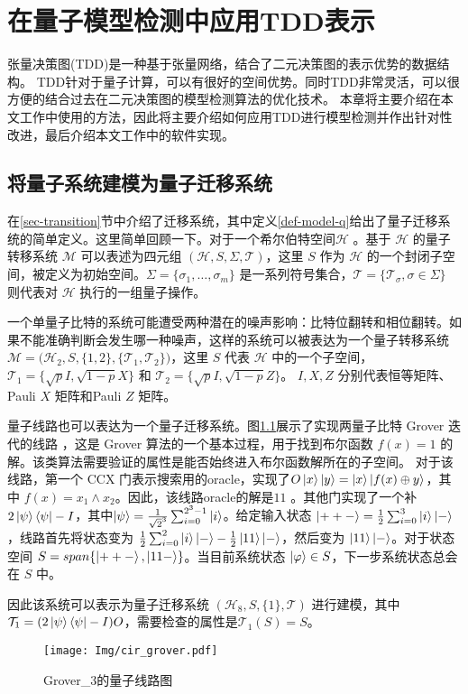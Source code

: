 \chapter{在量子模型检测中应用TDD表示}

张量决策图(TDD)是一种基于张量网络，结合了二元决策图的表示优势的数据结构。
TDD针对于量子计算，可以有很好的空间优势。同时TDD非常灵活，可以很方便的结合过去在二元决策图的模型检测算法的优化技术。
本章将主要介绍在本文工作中使用的方法，因此将主要介绍如何应用TDD进行模型检测并作出针对性改进，最后介绍本文工作中的软件实现。

\section{将量子系统建模为量子迁移系统}

在\ref{sec-transition}节中介绍了迁移系统，其中定义\ref{def-model-q}给出了量子迁移系统的简单定义。这里简单回顾一下。对于一个希尔伯特空间$\mathcal{H}$ 。基于 $\mathcal{H}$ 的量子转移系统 $\mathcal{M}$ 可以表述为四元组 $(\mathcal{H}, S, \Sigma, \mathcal{T})$，这里 $S$ 作为 $\mathcal{H}$ 的一个封闭子空间，被定义为初始空间。$\Sigma=\{\sigma_1,\ldots,\sigma_m\}$ 是一系列符号集合，$\mathcal{T}=\{\mathcal{T}_\sigma, \sigma \in \Sigma\}$ 则代表对 $\mathcal{H}$ 执行的一组量子操作。


\begin{example}
    一个单量子比特的系统可能遭受两种潜在的噪声影响：比特位翻转和相位翻转。如果不能准确判断会发生哪一种噪声，这样的系统可以被表达为一个量子转移系统 $\mathcal{M}=\big(\mathcal{H}_2,S,\{1,2\},\{\mathcal{T}_1,\mathcal{T}_2\} \big)$，这里 $S$ 代表 $\mathcal{H}$ 中的一个子空间，$\mathcal{T}_1=\{\sqrt{p}I, \sqrt{1-p}X\}$ 和 $\mathcal{T}_2=\{\sqrt{p}I, \sqrt{1-p}Z\}$。 $I,X,Z$ 分别代表恒等矩阵、Pauli $X$ 矩阵和Pauli $Z$ 矩阵。
\end{example}
\begin{example}
    \label{ex-image-grover}
    量子线路也可以表达为一个量子迁移系统。图\ref{fig:grover}展示了实现两量子比特 Grover 迭代的线路 \citep{Grover_1996}，这是 Grover 算法的一个基本过程，用于找到布尔函数 $f(x)=1$ 的解。该类算法需要验证的属性是能否始终进入布尔函数解所在的子空间。
    对于该线路，第一个 CCX 门表示搜索用的oracle，实现了$ O\ket{x}\ket{y}=\ket{x}\ket{f(x)\oplus y}$，其中 $f(x)=x_1 \wedge x_2$。因此，该线路oracle的解是\(11\) 。其他门实现了一个补$2\ket{\psi}\bra{\psi}-I$，其中$\ket{\psi}=\frac{1}{\sqrt{2}^{3}}\sum_{i=0}^{2^3-1}\ket{i}$。给定输入状态 $\ket{++-}=\frac{1}{2}\sum_{i=0}^3\ket{i}\ket{-}$，线路首先将状态变为 $\frac{1}{2}\sum_{i=0}^2 \ket{i}\ket{-}-\frac{1}{2}\ket{11}\ket{-}$，然后变为 $\ket{11}\ket{-}$。对于状态空间 $S=span\{\ket{++-},\ket{11-}\}$。当目前系统状态 $\ket{\varphi} \in S$，下一步系统状态总会在 $S$ 中。

    因此该系统可以表示为量子迁移系统 $(\mathcal{H}_8, S, \{1\}, \mathcal{T})$ 进行建模，其中 $\mathcal{T}_1 = {(2\ket{\psi}\bra{\psi}-I) O}$，需要检查的属性是$\mathcal{T}_1(S)=S$。
    \begin{figure}[!htbp]
        \centering
        \texttt{[image: Img/cir\_grover.pdf]}
        \caption{Grover\_3的量子线路图}
        \label{fig:grover}
    \end{figure} 
\end{example}

